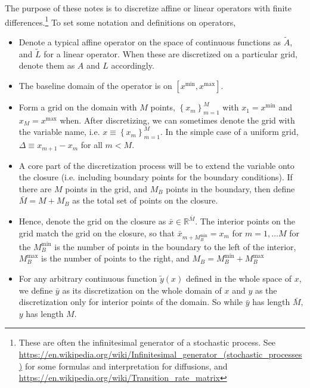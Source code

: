\documentclass[11pt]{article}
\newcommand{\set}[1]{\ensuremath{\left\{{#1}\right\}}}
\newcommand{\R}{\ensuremath{\mathbb{R}}}
\begin{document}
	The purpose of these notes is to discretize affine or linear operators with finite differences.\footnote{These are often the infinitesimal generator of a stochastic process.  See \url{https://en.wikipedia.org/wiki/Infinitesimal_generator_(stochastic_processes)} for some formulas and interpretation for diffusions, and \url{https://en.wikipedia.org/wiki/Transition_rate_matrix}} To set some notation and definitions on operators,
	\begin{itemize}
		\item Denote a typical affine operator on the space of continuous functions as $\tilde{A}$, and $\tilde{L}$ for a linear operator.  When these are discretized on a particular grid, denote them as $A$ and $L$ accordingly.
		\item The baseline domain of the operator is on $[x^{\min}, x^{\max}]$.
		\item Form a grid on the domain with $M$ points, $\set{x_m}_{m=1}^{M}$ with $x_1 = x^{\min}$ and $x_{M} = x^{\max}$ when. After discretizing, we can sometimes denote the grid with the variable name, i.e. $x \equiv \set{x_m}_{m=1}^M$. In the simple case of a uniform grid, $\Delta \equiv x_{m+1} - x_m$ for all $m < M$.
		\item A core part of the discretization process will be to extend the variable onto the closure (i.e. including boundary points for the boundary conditions).  If there are $M$ points in the grid, and $M_B$ points in the boundary, then define $\bar{M} = M + M_B$ as the total set of points on the closure.
		\item Hence, denote the grid on the closure as $\bar{x} \in \R^{\bar{M}}$.  The interior points on the grid match the grid on the closure, so that $\bar{x}_{m+M^{\min}_B} = x_{m}$ for $m = 1, \ldots M$ for the $M^{\min}_B$ is the number of points in the boundary to the left of the interior, $M^{\max}_B$ is the number of points to the right, and $M_B = M^{\min}_B + M^{\max}_B$
		\item For any arbitrary continuous function $\tilde{y}(x)$ defined in the whole space of $x$, we define $\bar{y}$ as its discretization on the whole domain of $x$ and $y$ as the discretization only for interior points of the domain. So while $\bar{y}$ has length $\bar{M}$, $y$ has length $M$.
	\end{itemize}
\end{document}
